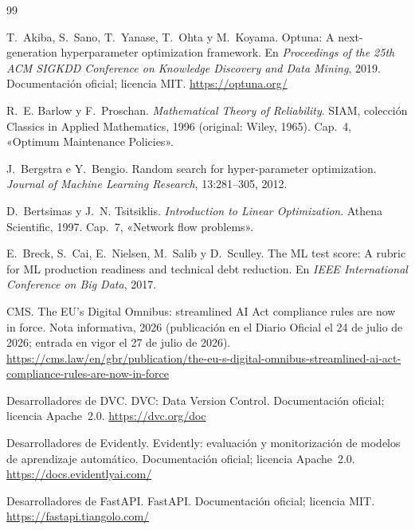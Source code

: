 \begin{thebibliography}{99}
\small

T.~Akiba, S.~Sano, T.~Yanase, T.~Ohta y M.~Koyama.
\newblock Optuna: A next-generation hyperparameter optimization framework.
\newblock En \emph{Proceedings of the 25th ACM SIGKDD Conference on Knowledge Discovery and Data Mining}, 2019. Documentación oficial; licencia MIT.
\newblock \url{https://optuna.org/}

R.~E. Barlow y F.~Proschan.
\newblock \emph{Mathematical Theory of Reliability}.
\newblock SIAM, colección Classics in Applied Mathematics, 1996 (original: Wiley, 1965). Cap.~4, «Optimum Maintenance Policies».

J.~Bergstra e Y.~Bengio.
\newblock Random search for hyper-parameter optimization.
\newblock \emph{Journal of Machine Learning Research}, 13:281--305, 2012.

D.~Bertsimas y J.~N. Tsitsiklis.
\newblock \emph{Introduction to Linear Optimization}.
\newblock Athena Scientific, 1997. Cap.~7, «Network flow problems».

E.~Breck, S.~Cai, E.~Nielsen, M.~Salib y D.~Sculley.
\newblock The ML test score: A rubric for ML production readiness and technical debt reduction.
\newblock En \emph{IEEE International Conference on Big Data}, 2017.

CMS.
\newblock The EU's Digital Omnibus: streamlined AI Act compliance rules are now in force.
\newblock Nota informativa, 2026 (publicación en el Diario Oficial el 24 de julio de 2026; entrada en vigor el 27 de julio de 2026).
\newblock \url{https://cms.law/en/gbr/publication/the-eu-s-digital-omnibus-streamlined-ai-act-compliance-rules-are-now-in-force}

Desarrolladores de DVC.
\newblock DVC: Data Version Control. Documentación oficial; licencia Apache~2.0.
\newblock \url{https://dvc.org/doc}

Desarrolladores de Evidently.
\newblock Evidently: evaluación y monitorización de modelos de aprendizaje automático. Documentación oficial; licencia Apache~2.0.
\newblock \url{https://docs.evidentlyai.com/}

Desarrolladores de FastAPI.
\newblock FastAPI. Documentación oficial; licencia MIT.
\newblock \url{https://fastapi.tiangolo.com/}


\end{thebibliography}
